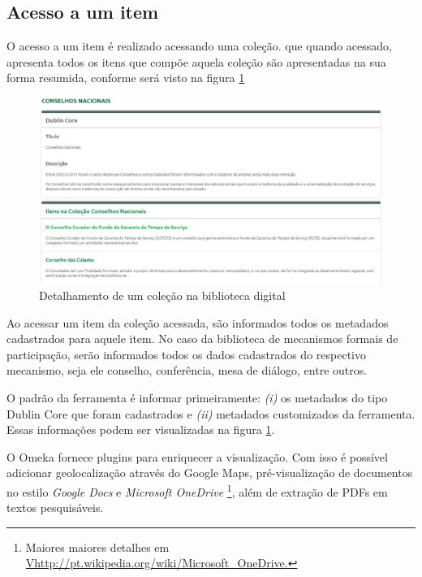 \subsection*{Acesso a um item}

O acesso a um item é realizado acessando uma coleção. que quando acessado, apresenta todos os itens que compõe aquela coleção são apresentadas na sua forma resumida, conforme será visto na figura \ref{fig:descricao_prototipo}

\graphicspath{{figuras/prototipo/}}
\begin{figure}[H]
\centering
\includegraphics[width=1.0\textwidth]{descricao-colecao}
\caption{Detalhamento de um coleção na biblioteca digital}
\label{fig:descricao_prototipo}
\end{figure}

Ao acessar um item da coleção acessada, são informados todos os metadados cadastrados para aquele item. No caso da biblioteca de mecanismos formais de participação, serão informados todos os dados cadastrados do respectivo mecanismo, seja ele conselho, conferência, mesa de diálogo, entre outros. 

O padrão da ferramenta é informar primeiramente: \textit{(i)} os metadados do tipo Dublin Core que foram cadastrados e \textit{(ii)} metadados customizados da ferramenta. Essas informações podem ser visualizadas na figura \ref{fig:descricao_prototipo}.

O Omeka fornece plugins para enriquecer a visualização. Com isso é possível adicionar geolocalização através do Google Maps, pré-visualização de documentos no estilo \textit{Google Docs} e \textit{Microsoft OneDrive} \footnote{Maiores maiores detalhes em \url{Vhttp://pt.wikipedia.org/wiki/Microsoft\_OneDrive.}}, além de extração de PDFs em textos pesquisáveis.

